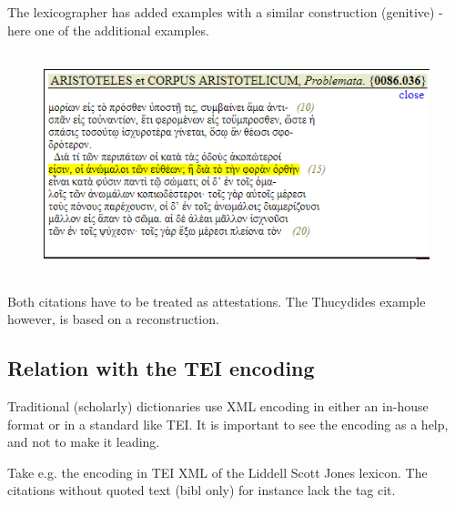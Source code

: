 \documentclass[10pt]{article}
\begin{document}

\par

 The lexicographer has added examples with a similar construction (genitive) - here one of the additional examples.\par




\begin{figure}[H]
	\begin{Center}
		\includegraphics[width=5.2in,height=2.56in]{./image11.png}
	\end{Center}
\end{figure}



\par



 Both citations have to be treated as attestations. The Thucydides example however, is based on a reconstruction.

\newpage
\subsection*{Relation with the TEI encoding}
 Traditional (scholarly) dictionaries use XML encoding in either an in-house format or in a standard like TEI. It is important to see the encoding as a help, and not to make it leading.\par

 Take e.g. the encoding in TEI XML of the Liddell Scott Jones lexicon. The citations without quoted text (bibl only) for instance lack the tag cit.\par
\end{document}
